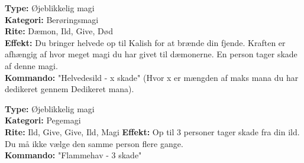 \begin{dHævn*}
\textbf{Type:} Øjeblikkelig magi\\
\textbf{Kategori:} Berøringsmagi\\
\textbf{Rite:} Dæmon, Ild, Give, Død\\
\textbf{Effekt:} Du bringer helvede op til Kalish for at brænde din fjende. Kraften er afhængig af hvor meget magi du har givet til dæmonerne. En person tager skade af denne magi.\\
\textbf{Kommando:} "Helvedesild - x skade" (Hvor x er mængden af maks mana du har dedikeret gennem Dedikeret mana).
\end{dHævn*}

\begin{dHævn*}[Flammehav]
\textbf{Type:} Øjeblikkelig magi\\
\textbf{Kategori:} Pegemagi\\
\textbf{Rite:} Ild, Give, Give, Ild, Magi
\textbf{Effekt:} Op til 3 personer tager skade fra din ild. Du må ikke vælge den samme person flere gange.\\
\textbf{Kommando:} "Flammehav - 3 skade"
\end{dHævn*}

